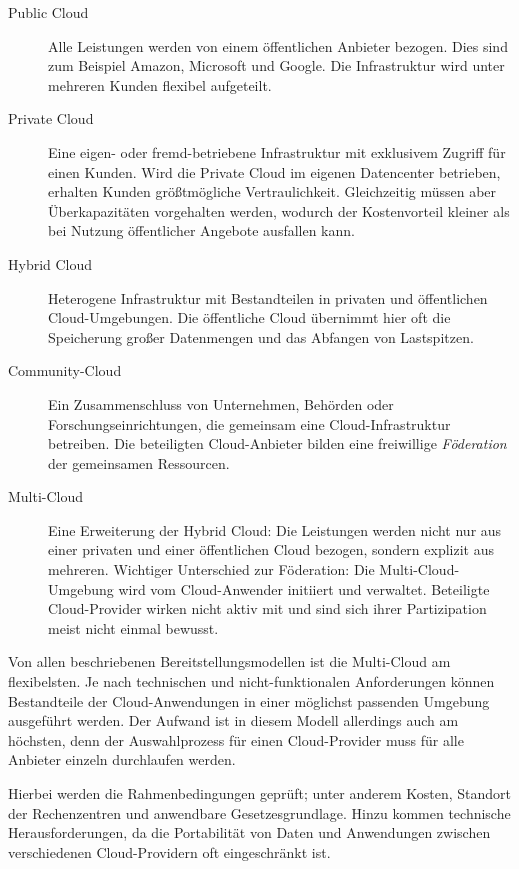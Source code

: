\begin{description}
	
	\item[Public Cloud] Alle Leistungen werden von einem öffentlichen Anbieter bezogen. Dies sind zum Beispiel Amazon, Microsoft und Google. Die Infrastruktur wird unter mehreren Kunden flexibel aufgeteilt.
	
	\item[Private Cloud] Eine eigen- oder fremd-betriebene Infrastruktur mit exklusivem Zugriff für einen Kunden. Wird die Private Cloud im eigenen Datencenter betrieben, erhalten Kunden größtmögliche Vertraulichkeit. Gleichzeitig müssen aber Überkapazitäten vorgehalten werden, wodurch der Kostenvorteil kleiner als bei Nutzung öffentlicher Angebote ausfallen kann.
	
	\item[Hybrid Cloud] Heterogene Infrastruktur mit Bestandteilen in privaten und öffentlichen Cloud-Umgebungen. Die öffentliche Cloud übernimmt hier oft die Speicherung großer Datenmengen und das Abfangen von Lastspitzen.
	
	\item[Community-Cloud] Ein Zusammenschluss von Unternehmen, Behörden oder Forschungseinrichtungen, die gemeinsam eine Cloud-Infrastruktur betreiben. Die beteiligten Cloud-Anbieter bilden eine freiwillige \emph{Föderation} der gemeinsamen Ressourcen.
	
	\item[Multi-Cloud] Eine Erweiterung der Hybrid Cloud: Die Leistungen werden nicht nur aus einer privaten und einer öffentlichen Cloud bezogen, sondern explizit aus mehreren. Wichtiger Unterschied zur Föderation: Die Multi-Cloud-Umgebung wird vom Cloud-Anwender initiiert und verwaltet. Beteiligte Cloud-Provider wirken nicht aktiv mit und sind sich ihrer Partizipation meist nicht einmal bewusst.
	
\end{description}

\noindent
Von allen beschriebenen Bereitstellungsmodellen ist die Multi-Cloud am flexibelsten. Je nach technischen und nicht-funktionalen Anforderungen können Bestandteile der Cloud-Anwendungen in einer möglichst passenden Umgebung ausgeführt werden. Der Aufwand ist in diesem Modell allerdings auch am höchsten, denn der Auswahlprozess für einen Cloud-Provider muss für alle Anbieter einzeln durchlaufen werden.

Hierbei werden die Rahmenbedingungen geprüft; unter anderem Kosten, Standort der Rechenzentren und anwendbare Gesetzesgrundlage. Hinzu kommen technische Herausforderungen, da die Portabilität von Daten und Anwendungen zwischen verschiedenen Cloud-Providern oft eingeschränkt ist.

